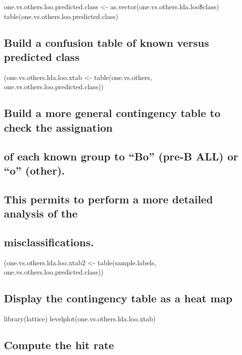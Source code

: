 one.vs.others.loo.predicted.class \textless{}-
as.vector(one.vs.others.lda.loo\$class)
table(one.vs.others.loo.predicted.class)

\subsection{Build a confusion table of known versus predicted
class}\label{build-a-confusion-table-of-known-versus-predicted-class}

(one.vs.others.lda.loo.xtab \textless{}- table(one.vs.others,
one.vs.others.loo.predicted.class))

\subsection{Build a more general contingency table to check the
assignation}\label{build-a-more-general-contingency-table-to-check-the-assignation}

\subsection{of each known group to ``Bo'' (pre-B ALL) or ``o''
(other).}\label{of-each-known-group-to-bo-pre-b-all-or-o-other.}

\subsection{This permits to perform a more detailed analysis of
the}\label{this-permits-to-perform-a-more-detailed-analysis-of-the}

\subsection{misclassifications.}\label{misclassifications.}

(one.vs.others.lda.loo.xtab2 \textless{}- table(sample.labels,
one.vs.others.loo.predicted.class))

\subsection{Display the contingency table as a heat
map}\label{display-the-contingency-table-as-a-heat-map}

library(lattice) levelplot(one.vs.others.lda.loo.xtab)

\subsection{Compute the hit rate}\label{compute-the-hit-rate-2}

